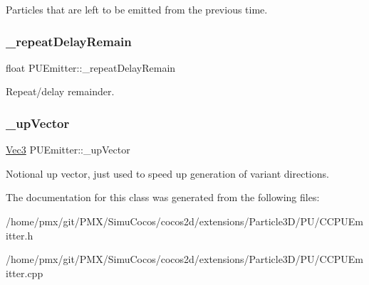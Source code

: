 Particles that are left to be emitted from the previous time. \mbox{\label{classPUEmitter_ad4f5d530832b33afb555fba214cf5864}} 
\subsubsection{\texorpdfstring{\+\_\+repeat\+Delay\+Remain}{\_repeatDelayRemain}}
{\footnotesize\ttfamily float P\+U\+Emitter\+::\+\_\+repeat\+Delay\+Remain\hspace{0.3cm}{\ttfamily [protected]}}

Repeat/delay remainder. \mbox{\label{classPUEmitter_af3b3eac3d9539b5c2d8597dfa41a17cb}} 
\subsubsection{\texorpdfstring{\+\_\+up\+Vector}{\_upVector}}
{\footnotesize\ttfamily \hyperlink{classVec3}{Vec3} P\+U\+Emitter\+::\+\_\+up\+Vector\hspace{0.3cm}{\ttfamily [protected]}}

Notional up vector, just used to speed up generation of variant directions. 

The documentation for this class was generated from the following files\+:\begin{DoxyCompactItemize}
\item 
/home/pmx/git/\+P\+M\+X/\+Simu\+Cocos/cocos2d/extensions/\+Particle3\+D/\+P\+U/C\+C\+P\+U\+Emitter.\+h\item 
/home/pmx/git/\+P\+M\+X/\+Simu\+Cocos/cocos2d/extensions/\+Particle3\+D/\+P\+U/C\+C\+P\+U\+Emitter.\+cpp\end{DoxyCompactItemize}
